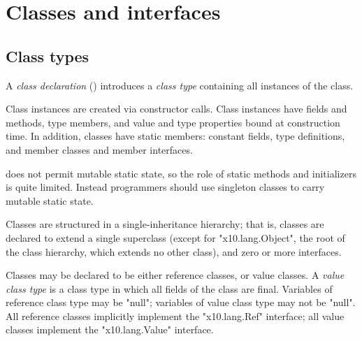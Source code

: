 \section{Classes and interfaces}
\label{ReferenceTypes}

\subsection{Class types}


        A {\em class declaration} ()
        introduces a 
        {\em class type}
        containing all instances of the class.

        Class instances are created via
        constructor calls.  Class instances have fields and
        methods, type members, and value and type properties bound at
        construction time.  In addition, classes have static
        members: constant fields, type definitions, and member
        classes and member interfaces.

\Xten{} does
not
permit mutable static state, so the role of static methods and
initializers is quite limited. Instead programmers should use
singleton classes to carry mutable static state.


        Classes
        are structured in a
        single-inheritance hierarchy; that is,
        classes are declared to extend a single
        superclass (except for \xcd"x10.lang.Object", the root
        of the class hierarchy, which extends no other class),
        and zero or more interfaces.


        Classes may be declared to be either reference classes,
        or value classes.
A \emph{value class type}
is a class type in which all fields of the class are final.
%
Variables of reference class type may be \xcd"null"; 
variables of value class type may not be \xcd"null".
%
        All reference classes implicitly implement the
        \xcd"x10.lang.Ref" interface; all value classes
        implement the \xcd"x10.lang.Value" interface.

